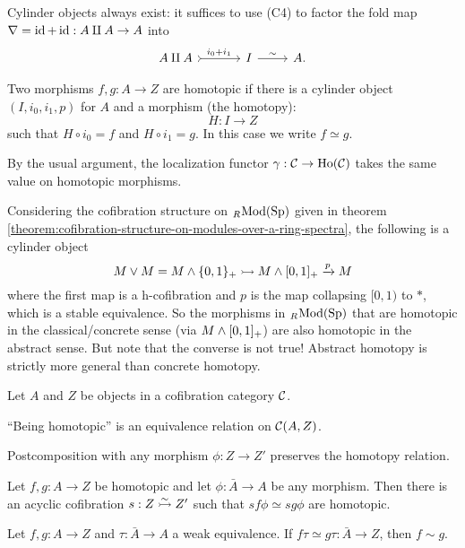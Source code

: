 Cylinder objects always exist: it suffices to use (C4) to factor the fold map $\nabla=\operatorname{id}+\operatorname{id}:A\amalg A\to A$ into
\[
\begin{tikzcd}
A\amalg A \ar[r,tail,"i_0+i_1"] &[+1em] I \ar[r,"\sim"] & A.
\end{tikzcd}
\]

\begin{definition}
Two morphisms $f,g:A\to Z$ are homotopic if there is a cylinder object $(I,i_0,i_1,p)$ for $A$ and a morphism (the homotopy):
\[H:I\to Z\]
such that $H\circ i_0=f$ and $H\circ i_1=g$. In this case we write $f\simeq g$.
\end{definition}

By the usual argument, the localization functor $\gamma:\mathcal{C}\to\operatorname{Ho}(\mathcal{C})$ takes the same value on homotopic morphisms.

\begin{example}
Considering the cofibration structure on ${}_{R\!}\operatorname{Mod}({\normalfont\textup{Sp}})$ given in theorem \ref{theorem:cofibration-structure-on-modules-over-a-ring-spectra}, the following is a cylinder object
\[M\vee M=M\wedge\{0,1\}_+\rightarrowtail M\wedge[0,1]_+\xrightarrow{p}M\]
where the first map is a h-cofibration and $p$ is the map collapsing $[0,1)$ to $*$, which is a stable equivalence. So the morphisms in ${}_{R\!}\operatorname{Mod}({\normalfont\textup{Sp}})$ that are homotopic in the classical/concrete sense (via $M\wedge[0,1]_+$) are also homotopic in the abstract sense. But note that the converse is not true! Abstract homotopy is strictly more general than concrete homotopy.
\end{example}

\begin{proposition}
Let $A$ and $Z$ be objects in a cofibration category $\mathcal{C}$.
\begin{rmnumerate}
\item \enquote{Being homotopic} is an equivalence relation on $\mathcal{C}(A,Z)$.
\item Postcomposition with any morphism $\phi:Z\to Z'$ preserves the homotopy relation.
\item Let $f,g:A\to Z$ be homotopic and let $\phi:\bar A\to A$ be any morphism. Then there is an acyclic cofibration $s:Z\acco Z'$ such that $sf\phi\simeq sg\phi$ are homotopic.
\item Let $f,g:A\to Z$ and $\tau:\bar A\to A$ a weak equivalence. If $f\tau\simeq g\tau:\bar A\to Z$, then $f\sim g$.
\end{rmnumerate}
\end{proposition}

